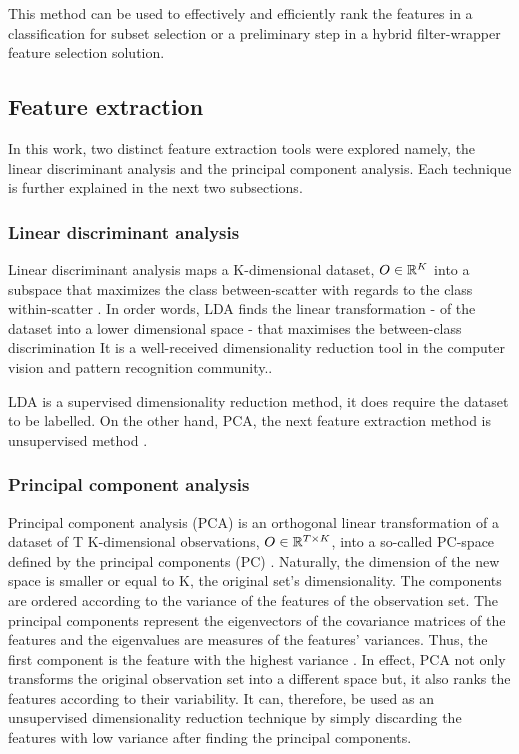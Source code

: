 This method can be used to effectively and efficiently rank the features in a classification for subset selection or a preliminary step in a hybrid filter-wrapper feature selection solution.  

\subsection{Feature extraction}
In this work, two distinct feature extraction tools were explored namely, the linear discriminant analysis and the principal component analysis.
Each technique is further explained in the next two subsections.
 
\subsubsection{Linear discriminant analysis}
Linear discriminant analysis maps a K-dimensional dataset, \(O \in \Bbb R^{K}\) into a subspace that maximizes the class between-scatter with regards to the class within-scatter \cite{prtool}.
In order words, LDA finds the linear transformation - of the dataset into a lower dimensional space - that maximises the between-class discrimination \cite{lda2015}
It is a well-received dimensionality reduction tool in the computer vision and pattern recognition community.\cite{lda2015}.

 LDA is a supervised dimensionality reduction method, it does require the dataset to be labelled. On the other hand, PCA, the next feature extraction method is unsupervised method \cite{prtool}.
 
\subsubsection{Principal component analysis}
 Principal component analysis (PCA) is an orthogonal linear transformation of a dataset of T K-dimensional observations, \(O \in \Bbb R^{T\times K}\), into a so-called PC-space defined by the principal components (PC) \cite{dime2017}.
 Naturally, the dimension of the new space is smaller or equal to K, the original set's dimensionality. The components are ordered according to the variance of the features of the observation set. The principal components represent the eigenvectors of the covariance matrices of the features and the eigenvalues are measures of the features' variances. Thus, the first component is the feature with the highest variance \cite{dime2017}.
 In effect, PCA not only transforms the original observation set into a different space but, it also ranks the features according to their variability. It can, therefore, be used as an unsupervised dimensionality reduction technique by simply discarding the features with low variance after finding the principal components.
